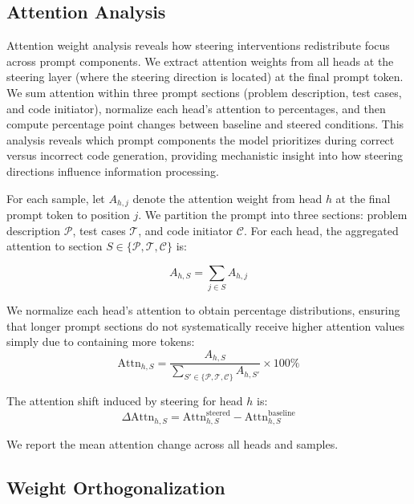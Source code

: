 \subsection{Attention Analysis}

Attention weight analysis reveals how steering interventions redistribute focus across prompt components. We extract attention weights from all heads at the steering layer (where the steering direction is located) at the final prompt token. We sum attention within three prompt sections (problem description, test cases, and code initiator), normalize each head's attention to percentages, and then compute percentage point changes between baseline and steered conditions. This analysis reveals which prompt components the model prioritizes during correct versus incorrect code generation, providing mechanistic insight into how steering directions influence information processing.

For each sample, let $A_{h,j}$ denote the attention weight from head $h$ at the final prompt token to position $j$. We partition the prompt into three sections: problem description $\mathcal{P}$, test cases $\mathcal{T}$, and code initiator $\mathcal{C}$. For each head, the aggregated attention to section $S \in \{\mathcal{P}, \mathcal{T}, \mathcal{C}\}$ is:

\begin{equation}
A_{h,S} = \sum_{j \in S} A_{h,j}
\end{equation}

We normalize each head's attention to obtain percentage distributions, ensuring that longer prompt sections do not systematically receive higher attention values simply due to containing more tokens:
\begin{equation}
\text{Attn}_{h,S} = \frac{A_{h,S}}{\sum_{S' \in \{\mathcal{P}, \mathcal{T}, \mathcal{C}\}} A_{h,S'}} \times 100\%
\end{equation}

The attention shift induced by steering for head $h$ is:
\begin{equation}
\Delta\text{Attn}_{h,S} = \text{Attn}_{h,S}^{\text{steered}} - \text{Attn}_{h,S}^{\text{baseline}}
\end{equation}

We report the mean attention change across all heads and samples.

\subsection{Weight Orthogonalization}


